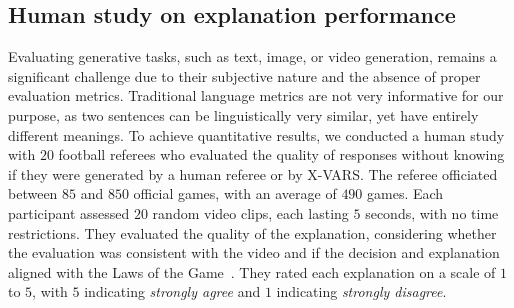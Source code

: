 \begin{table}
    \centering
\caption{ \textbf{Score and distributions obtained during our human study comparing the quality of referees and X-VARS generated explanations.}
The mean scores of X-VARS closely match those of human referees. In 46\% of the video clips,
X-VARS achieved higher scores for its explanations than the human referees. 
The distribution of the results is very similar for human referees and X-VARS. 
A score of 5 is the highest and represents \emph{strongly agree} while 1 is \emph{strongly disagree}.
}
    \label{tab:quantitative_distribution}
\end{table}\subsection{Human study on explanation performance}
Evaluating generative tasks, such as text, image, or video generation, remains a significant challenge due to their subjective nature and the absence of proper evaluation metrics. 
Traditional language metrics are not very informative for our purpose, as two sentences can be linguistically very similar, yet have entirely different meanings. 
To achieve quantitative results, we conducted a human study with $20$ football referees who evaluated the quality of responses without knowing if they were generated by a human referee or by X-VARS. 
The referee officiated between $85$ and $850$ official games, with an average of $490$ games.
Each participant assessed $20$ random video clips, each lasting $5$ seconds, with no time restrictions. 
They evaluated the quality of the explanation, considering whether the evaluation was consistent with the video and if the decision and explanation aligned with the Laws of the Game~\cite{IFAB2022Laws}.
They rated each explanation on a scale of $1$ to $5$, with $5$ indicating \textit{strongly agree} and $1$ indicating \textit{strongly disagree}.
